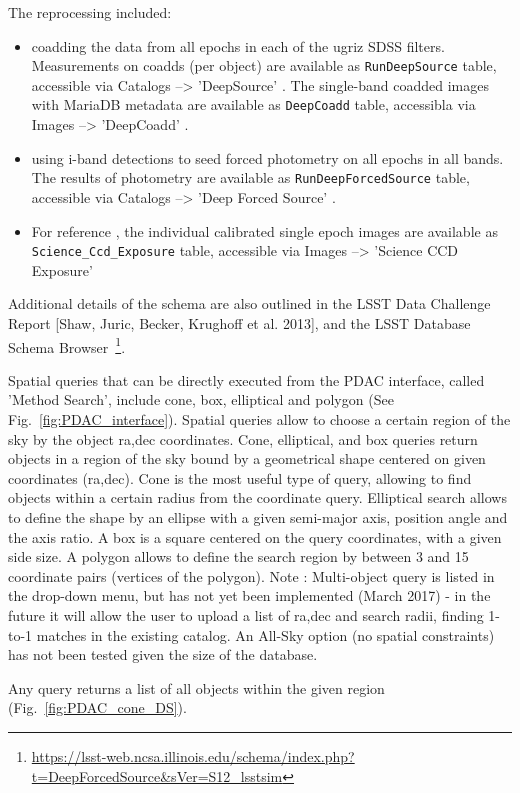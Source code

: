 \documentclass[fleqn,usenatbib]{mnras} %
\begin{document}
The reprocessing included: 
\begin{itemize}
\item coadding the data from all epochs in each of the ugriz SDSS filters. Measurements on coadds (per object) are available as  \verb|RunDeepSource| table, accessible via Catalogs -->   'DeepSource' .  The single-band coadded images with MariaDB metadata are available as \verb|DeepCoadd| table, accessibla via Images -->  'DeepCoadd' . 
\item using i-band detections to seed forced photometry on all epochs in all bands. The results of photometry are available as \verb|RunDeepForcedSource| table, accessible via  Catalogs --> 'Deep Forced Source' .  
\item For reference , the individual calibrated single epoch images are available as \verb|Science_Ccd_Exposure| table, accessible via Images --> 'Science CCD Exposure'   
\end{itemize}

Additional details of the schema are also outlined in the LSST Data Challenge Report [Shaw, Juric, Becker, Krughoff et al. 2013], and the LSST Database Schema Browser~\footnote{\url{https://lsst-web.ncsa.illinois.edu/schema/index.php?t=DeepForcedSource&sVer=S12_lsstsim}}. 


Spatial queries that can be directly executed from the PDAC interface, called 'Method Search',  include cone, box, elliptical and polygon (See Fig.~\ref{fig:PDAC_interface}).  Spatial queries allow to choose a certain region of the sky by the object ra,dec coordinates.  
Cone, elliptical, and box queries  return objects in a region of the sky bound by a geometrical shape centered on given coordinates (ra,dec). Cone is the most useful type of query, allowing to find objects within a certain radius from the coordinate query.  Elliptical search allows to define the shape by an ellipse with a given semi-major axis,  position angle and the axis ratio. A box is a square centered on the query coordinates, with a given side size.  A polygon allows to define the search region by between 3 and 15 coordinate pairs (vertices of the polygon). Note : Multi-object query is listed in the drop-down menu, but has not yet been implemented (March 2017) - in the future it will allow the user to upload a list of ra,dec and search radii,  finding 1-to-1 matches in the existing catalog. An All-Sky option (no spatial constraints) has not been tested given the size of the database.  

Any query returns a list of all objects within the given region (Fig.~\ref{fig:PDAC_cone_DS}).  
\end{document}
